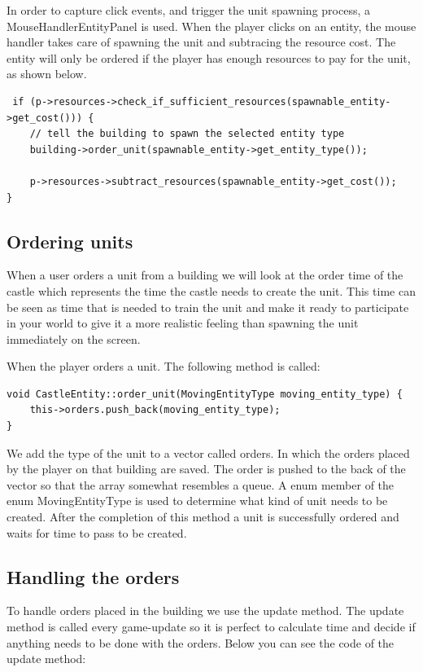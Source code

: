 In order to capture click events, and trigger the unit spawning process, a MouseHandlerEntityPanel is used. When the player clicks on an entity, the mouse handler takes care of spawning the unit and subtracing the resource cost. The entity will only be ordered if the player has enough resources to pay for the unit, as shown below.

\begin{lstlisting}
 if (p->resources->check_if_sufficient_resources(spawnable_entity->get_cost())) {
    // tell the building to spawn the selected entity type
    building->order_unit(spawnable_entity->get_entity_type());
    
    p->resources->subtract_resources(spawnable_entity->get_cost());
}
\end{lstlisting}

\subsection{Ordering units}
When a user orders a unit from a building we will look at the order time of the castle which represents the time the castle needs to create the unit. This time can be seen as time that is needed to train the unit and make it ready to participate in your world to give it a more realistic feeling than spawning the unit immediately on the screen. 

When the player orders a unit. The following method is called:

\begin{lstlisting}
void CastleEntity::order_unit(MovingEntityType moving_entity_type) {
    this->orders.push_back(moving_entity_type);
}
\end{lstlisting}

We add the type of the unit to a vector called orders. In which the orders placed by the player on that building are saved. The order is pushed to the back of the vector so that the array somewhat resembles a queue. A enum member of the enum MovingEntityType is used to determine what kind of unit needs to be created. After the completion of this method a unit is successfully ordered and waits for time to pass to be created.

\subsection{Handling the orders}
To handle orders placed in the building we use the update method. The update method is called every game-update so it is perfect to calculate time and decide if anything needs to be done with the orders. Below you can see the code of the update method:

